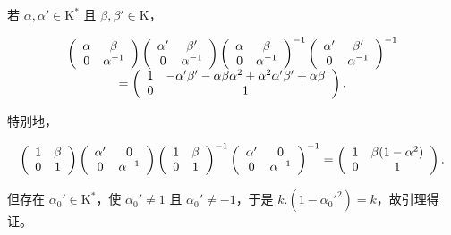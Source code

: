 若 \(\alpha, \alpha' \in \mathrm{K}^*\) 且 \(\beta, \beta' \in \mathrm{K}\)，

\[
\begin{array}{c} \left( \begin{array}{c c} \alpha & \beta \\ 0 & \alpha^ {- 1} \end{array} \right) \left( \begin{array}{c c} \alpha^ {\prime} & \beta^ {\prime} \\ 0 & \alpha^ {- 1} \end{array} \right) \left( \begin{array}{c c} \alpha & \beta \\ 0 & \alpha^ {- 1} \end{array} \right) ^ {- 1} \left( \begin{array}{c c} \alpha^ {\prime} & \beta^ {\prime} \\ 0 & \alpha^ {- 1} \end{array} \right) ^ {- 1} \\ = \left( \begin{array}{c c} 1 & - \alpha^ {\prime} \beta^ {\prime} - \alpha \beta \alpha^ {2} + \alpha^ {2} \alpha^ {\prime} \beta^ {\prime} + \alpha \beta \\ 0 & 1 \end{array} \right). \end{array}
\]

特别地，

\[
\left( \begin{array}{c c} 1 & \beta \\ 0 & 1 \end{array} \right) \left( \begin{array}{c c} \alpha^ {\prime} & 0 \\ 0 & \alpha^ {- 1} \end{array} \right) \left( \begin{array}{c c} 1 & \beta \\ 0 & 1 \end{array} \right) ^ {- 1} \left( \begin{array}{c c} \alpha^ {\prime} & 0 \\ 0 & \alpha^ {- 1} \end{array} \right) ^ {- 1} = \left( \begin{array}{c c} 1 & \beta (1 - \alpha^ {2}) \\ 0 & 1 \end{array} \right).
\]

但存在 \(\alpha_0' \in \mathrm{K}^*\)，使 \(\alpha_0' \neq 1\) 且 \(\alpha_0' \neq -1\)，于是 \(k.(1 - \alpha_0'^2) = k\)，故引理得证。

